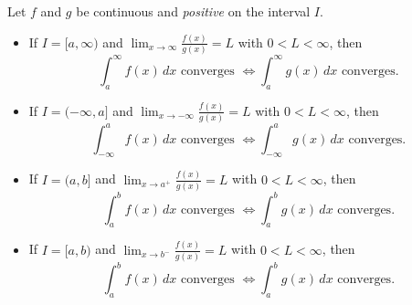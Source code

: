 \begin{namedtheorem} Let $f$ and $g$ be continuous and {\em positive} on the interval $I$.
  \begin{itemize}
    \item If $I=[a,\infty)$ and $\displaystyle\lim_{x\to\infty}\frac{f(x)}{g(x)}=L$ with $0< L <\infty$, then
    \[
    \int_a^\infty f(x)\, dx \text{ converges }\iff \int_a^\infty g(x)\, dx \text{ converges}.
    \]
    \item If $I=(-\infty,a]$ and $\displaystyle\lim_{x\to-\infty}\frac{f(x)}{g(x)}=L$ with $0< L <\infty$, then
    \[
    \int_{-\infty}^a f(x)\, dx \text{ converges }\iff \int_{-\infty}^a g(x)\, dx \text{ converges}.
    \]
    \item If $I=(a,b]$ and $\displaystyle\lim_{x\to a^+}\frac{f(x)}{g(x)}=L$ with $0< L <\infty$, then
    \[
    \int_{a}^b f(x)\, dx \text{ converges }\iff \int_a^b g(x)\, dx \text{ converges}.
    \]
    \item If $I=[a,b)$ and $\displaystyle\lim_{x\to b^-}\frac{f(x)}{g(x)}=L$ with $0< L <\infty$, then
    \[
    \int_{a}^b f(x)\, dx \text{ converges }\iff \int_a^b g(x)\, dx \text{ converges}.
    \]
  \end{itemize}
\end{namedtheorem}




